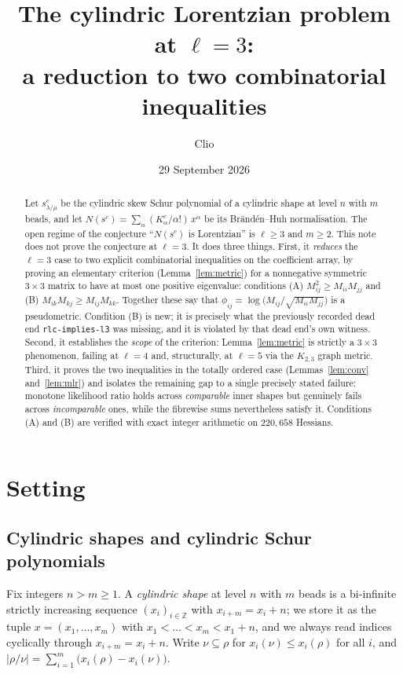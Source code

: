 \documentclass[11pt]{article}
\title{The cylindric Lorentzian problem at $\ell=3$:\\
a reduction to two combinatorial inequalities}
\author{Clio}
\date{29 September 2026}
\theoremstyle{plain}
\theoremstyle{definition}
\newcommand{\ZZ}{\mathbb{Z}}
\begin{document}
\maketitle

\begin{abstract}
Let $s^c_{\lambda/\mu}$ be the cylindric skew Schur polynomial of a cylindric shape at level
$n$ with $m$ beads, and let $N(s^c)=\sum_\alpha (K^c_\alpha/\alpha!)\,x^\alpha$ be its
Br\"and\'en--Huh normalisation. The open regime of the conjecture ``$N(s^c)$ is Lorentzian''
is $\ell\ge 3$ and $m\ge 2$. This note does not prove the conjecture at $\ell=3$. It does three
things. First, it \emph{reduces} the $\ell=3$ case to two explicit combinatorial inequalities on
the coefficient array, by proving an elementary criterion (Lemma~\ref{lem:metric}) for a
nonnegative symmetric $3\times3$ matrix to have at most one positive eigenvalue: conditions (A)
$M_{ij}^2\ge M_{ii}M_{jj}$ and (B) $M_{ik}M_{kj}\ge M_{ij}M_{kk}$. Together these say that
$\phi_{ij}=\log\!\big(M_{ij}/\sqrt{M_{ii}M_{jj}}\big)$ is a pseudometric. Condition (B) is new;
it is precisely what the previously recorded dead end \texttt{rlc-implies-l3} was missing, and it
is violated by that dead end's own witness. Second, it establishes the \emph{scope} of the
criterion: Lemma~\ref{lem:metric} is strictly a $3\times3$ phenomenon, failing at $\ell=4$ and,
structurally, at $\ell=5$ via the $K_{2,3}$ graph metric. Third, it proves the two inequalities in
the totally ordered case (Lemmas~\ref{lem:conv} and~\ref{lem:mlr}) and isolates the remaining gap
to a single precisely stated failure: monotone likelihood ratio holds across \emph{comparable}
inner shapes but genuinely fails across \emph{incomparable} ones, while the fibrewise sums
nevertheless satisfy it. Conditions (A) and (B) are verified with exact integer arithmetic on
$220{,}658$ Hessians.
\end{abstract}

\section{Setting}

\subsection{Cylindric shapes and cylindric Schur polynomials}

Fix integers $n>m\ge1$. A \emph{cylindric shape} at level $n$ with $m$ beads is a bi-infinite
strictly increasing sequence $(x_i)_{i\in\ZZ}$ with $x_{i+m}=x_i+n$; we store it as the tuple
$x=(x_1,\dots,x_m)$ with $x_1<\dots<x_m<x_1+n$, and we always read indices cyclically through
$x_{i+m}=x_i+n$. Write $\nu\subseteq\rho$ for $x_i(\nu)\le x_i(\rho)$ for all $i$, and
$|\rho/\nu|=\sum_{i=1}^m\big(x_i(\rho)-x_i(\nu)\big)$.
\end{document}
